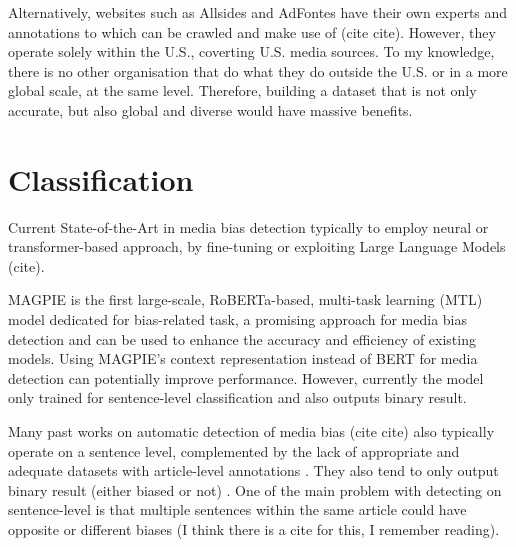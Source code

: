 Alternatively, websites such as Allsides and AdFontes have their own experts and annotations to which can be crawled and make use of (cite cite). However, they operate solely within the U.S., coverting U.S. media sources. To my knowledge, there is no other organisation that do what they do outside the U.S. or in a more global scale, at the same level. Therefore, building a dataset that is not only accurate, but also global and diverse would have massive benefits.

\begin{comment}
News Unfold: (NewsUnravel shows that a user-centric approach to media bias data collection can re- turn reliable data while being scalable and evaluated as easy to use. NewsUnravel demonstrates that feedback mechanisms are a promising strategy to reduce data collection expenses and continuously update datasets to changes in context.) (Our approach augments dataset quality by significantly increasing inter-annotator agreement by 26.31\% and improving classifier performance by 2.49\%)
\end{comment}

\section{Classification}

Current State-of-the-Art in media bias detection typically to employ neural or transformer-based approach, by fine-tuning or exploiting Large Language Models (cite).

MAGPIE \cite{horych-2024-magpie} is the first large-scale, RoBERTa-based, multi-task learning (MTL) model dedicated for bias-related task, a promising approach for media bias detection and can be used to enhance the accuracy and efficiency of existing models. Using MAGPIE's context representation instead of BERT for media detection can potentially improve performance. However, currently the model only trained for sentence-level classification and also outputs binary result.

Many past works on automatic detection of media bias (cite cite) also typically operate on a sentence level, complemented by the lack of appropriate and adequate datasets with article-level annotations \cite{demidov-2023-political-bias-classification}. They also tend to only output binary result (either biased or not) \cite{van-den-berg-2020-context, maab-2023-target-aware, lei-2024-sentence}. One of the main problem with detecting on sentence-level is that multiple sentences within the same article could have opposite or different biases (I think there is a cite for this, I remember reading).

